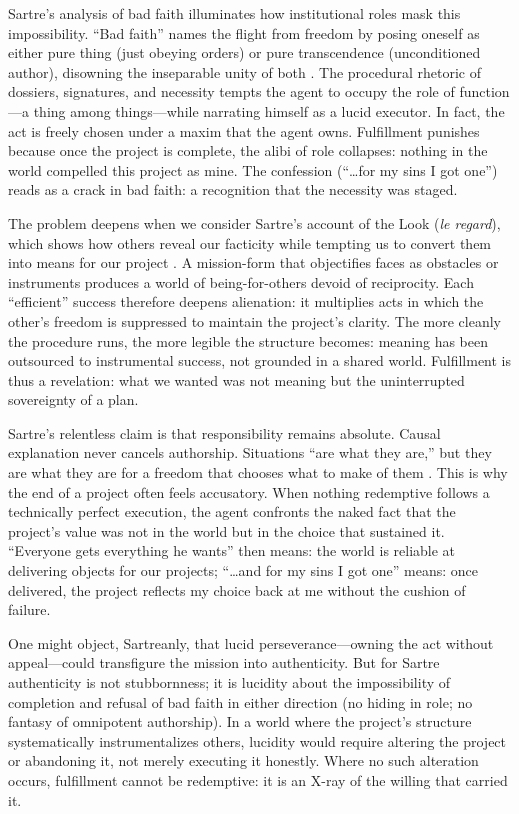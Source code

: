 Sartre's analysis of bad faith illuminates how institutional roles mask this impossibility.
``Bad faith'' names the flight from freedom by posing oneself as either pure thing (just
obeying orders) or pure transcendence (unconditioned author), disowning the inseparable unity
of both \parencite[pp.~86--116]{SartreBN2003}. The procedural rhetoric of dossiers, signatures,
and necessity tempts the agent to occupy the role of function—a thing among things—while
narrating himself as a lucid executor. In fact, the act is freely chosen under a maxim that the
agent owns. Fulfillment punishes because once the project is complete, the alibi of role
collapses: nothing in the world compelled this project as mine. The confession (``\ldots for my
sins I got one'') reads as a crack in bad faith: a recognition that the necessity was staged.

The problem deepens when we consider Sartre's account of the Look (\emph{le regard}), which
shows how others reveal our facticity while tempting us to convert them into means for our
project \parencite[pp.~252--302]{SartreBN2003}. A mission-form that objectifies faces as
obstacles or instruments produces a world of being-for-others devoid of reciprocity. Each
``efficient'' success therefore deepens alienation: it multiplies acts in which the other's
freedom is suppressed to maintain the project's clarity. The more cleanly the procedure runs,
the more legible the structure becomes: meaning has been outsourced to instrumental success,
not grounded in a shared world. Fulfillment is thus a revelation: what we wanted was not meaning
but the uninterrupted sovereignty of a plan.

Sartre's relentless claim is that responsibility remains absolute. Causal explanation never
cancels authorship. Situations ``are what they are,'' but they are what they are for a freedom
that chooses what to make of them \parencite[pp.~553--561]{SartreBN2003}. This is why the end
of a project often feels accusatory. When nothing redemptive follows a technically perfect
execution, the agent confronts the naked fact that the project's value was not in the world but
in the choice that sustained it. ``Everyone gets everything he wants'' then means: the world is
reliable at delivering objects for our projects; ``\ldots and for my sins I got one'' means:
once delivered, the project reflects my choice back at me without the cushion of failure.

One might object, Sartreanly, that lucid perseverance—owning the act without appeal—could
transfigure the mission into authenticity. But for Sartre authenticity is not stubbornness; it
is lucidity about the impossibility of completion and refusal of bad faith in either direction
(no hiding in role; no fantasy of omnipotent authorship). In a world where the project's
structure systematically instrumentalizes others, lucidity would require altering the project or
abandoning it, not merely executing it honestly. Where no such alteration occurs, fulfillment
cannot be redemptive: it is an X-ray of the willing that carried it.

